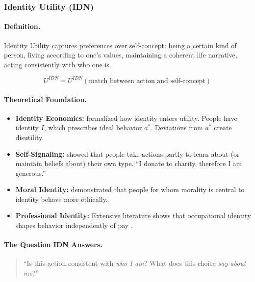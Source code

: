 \subsubsection{Identity Utility (IDN)}

\paragraph{Definition.}
Identity Utility captures preferences over self-concept:
being a certain kind of person, living according to one's values,
maintaining a coherent life narrative, acting consistently with who one is.

\begin{equation}
U^{IDN} = U^{IDN}(\text{match between action and self-concept})
\end{equation}

\paragraph{Theoretical Foundation.}

\begin{itemize}
\item \textbf{Identity Economics:} \citet{akerlofkranton} formalized how 
identity enters utility. People have identity $I$, which prescribes ideal 
behavior $a^*$. Deviations from $a^*$ create disutility.

\item \textbf{Self-Signaling:} \citet{benaboutirole} showed that people 
take actions partly to learn about (or maintain beliefs about) their own type.
``I donate to charity, therefore I am generous.''

\item \textbf{Moral Identity:} \citet{aquino2002self} demonstrated that 
people for whom morality is central to identity behave more ethically.

\item \textbf{Professional Identity:} Extensive literature shows that 
occupational identity shapes behavior independently of pay \citep{ashforth1989social}.
\end{itemize}

\paragraph{The Question IDN Answers.}
\begin{quote}
``Is this action consistent with \emph{who I am}?
What does this choice \emph{say about me}?''
\end{quote}

